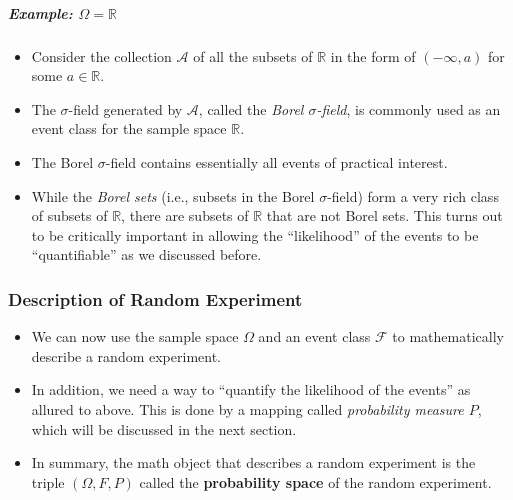 \subparagraph{Example: $\Omega=\mathbb{R}$}

\begin{itemize}
\item Consider the collection $\mathcal{A}$ of all the subsets of $\mathbb{R}$ in the form of $( -\infty, a)$ for some $a \in \mathbb{R}$.
\item The $\sigma$-field generated by $\mathcal{A}$, called the \textit{Borel $\sigma$-field}, is commonly used as an event class for the sample space $\mathbb{R}$.
\item The Borel $\sigma$-field contains essentially all events of practical interest.
\item While the \textit{Borel sets} (i.e., subsets in the Borel $\sigma$-field) form a very rich class of subsets of $\mathbb{R}$, there are subsets of $\mathbb{R}$ that are not Borel sets. This turns out to be critically important in allowing the ``likelihood'' of the events to be ``quantifiable'' as we discussed before.
\end{itemize}

\subsubsection{Description of Random Experiment}

\begin{itemize}
\item We can now use the sample space $\Omega$ and an event class $\mathcal{F}$ to mathematically describe a random experiment.
\item In addition, we need a way to ``quantify the likelihood of the events'' as allured to above. This is done by a mapping called \textit{probability measure $P$}, which will be discussed in the next section.
\item In summary, the math object that describes a random experiment is the triple $(\Omega, F, P)$ called the \textbf{probability space} of the random experiment.
\end{itemize}